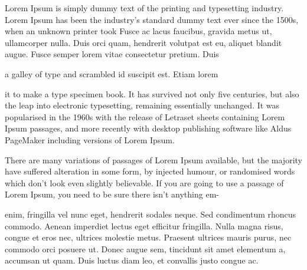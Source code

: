 \documentclass[11pt,letterpaper,openany]{scrbook}
\begin{document}
\begin{sloppypar}
\begin{paracol}{2}

\fontsize{11}{13}\leftfont Lorem Ipsum is simply dummy text of the printing and typesetting industry. Lorem Ipsum has been the industry's standard dummy text ever since the 1500s, when an unknown printer took \switchcolumn\fontsize{11}{13}\rightfont Fusce ac lacus faucibus, gravida metus ut, ullamcorper nulla. Duis orci quam, hendrerit volutpat est eu, aliquet blandit augue. Fusce semper lorem vitae consectetur pretium. Duis 

\end{paracol}


\begin{paracol}{3}

\fontsize{11}{13}\leftfont a galley of type and scrambled \switchcolumn[2]\fontsize{11}{13}\rightfont id suscipit est. Etiam lorem 

\end{paracol}

\begin{paracol}{3}\fontsize{11}{13}\leftfont it to make a type specimen book. It has survived not only five centuries, but also the leap into electronic typesetting, remaining essentially unchanged. It was popularised in the 1960s with the release of Letraset sheets containing Lorem Ipsum passages, and more recently with desktop publishing software like Aldus PageMaker including versions of Lorem Ipsum. 

\switchcolumn

\fontsize{13}{15}\centerfont There are many variations of passages of Lorem Ipsum available, but the majority have suffered alteration in some form, by injected humour, or randomised words which don't look even slightly believable. If you are going to use a passage of Lorem Ipsum, you need to be sure there isn't anything em- 

\switchcolumn

\fontsize{11}{13}\rightfont enim, fringilla vel nunc eget, hendrerit sodales neque. Sed condimentum rhoncus commodo. Aenean imperdiet lectus eget efficitur fringilla. Nulla magna risus, congue et eros nec, ultrices molestie metus. Praesent ultrices mauris purus, nec commodo orci posuere ut. Donec augue sem, tincidunt sit amet elementum a, accumsan ut quam. Duis luctus diam leo, et convallis justo congue ac. 

\end{paracol}


\end{sloppypar}
\end{document}
